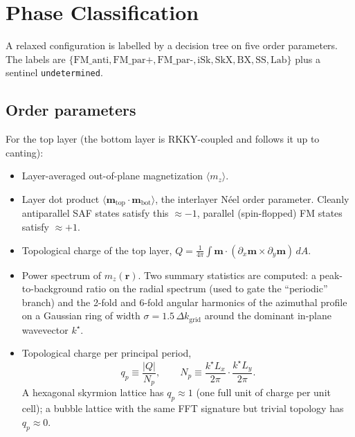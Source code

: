 \documentclass[11pt,a4paper]{article}
\newcommand{\mb}[1]{\mathbf{#1}}
\begin{document}
\section{Phase Classification}

A relaxed configuration is labelled by a decision tree on
five order parameters. The labels are
$\{\text{FM\_anti}, \text{FM\_par+}, \text{FM\_par-},
\text{iSk}, \text{SkX}, \text{BX}, \text{SS},
\text{Lab}\}$ plus a sentinel \texttt{undetermined}.

\subsection{Order parameters}

For the top layer (the bottom layer is RKKY-coupled and
follows it up to canting):
%
\begin{itemize}[nosep]
\item Layer-averaged out-of-plane magnetization
    $\langle m_z \rangle$.
\item Layer dot product
    $\langle \mb{m}_{\text{top}} \cdot
    \mb{m}_{\text{bot}} \rangle$, the interlayer
    Néel order parameter. Cleanly antiparallel SAF
    states satisfy this $\approx -1$, parallel
    (spin-flopped) FM states satisfy $\approx +1$.
\item Topological charge of the top layer,
    $Q = \frac{1}{4\pi} \int \mb{m} \cdot
    (\partial_x \mb{m} \times \partial_y \mb{m}) \, dA$.
\item Power spectrum of $m_z(\mb{r})$. Two summary
    statistics are computed: a peak-to-background ratio
    on the radial spectrum (used to gate the
    ``periodic'' branch) and the
    2-fold and 6-fold angular harmonics of the azimuthal
    profile on a Gaussian ring of width
    $\sigma = 1.5\, \Delta k_{\text{grid}}$ around the
    dominant in-plane wavevector $k^\star$.
\item Topological charge per principal period,
    \begin{equation}\label{eq:q_per_period}
    q_p \equiv \frac{|Q|}{N_p},
    \qquad
    N_p \equiv
    \frac{k^\star L_x}{2\pi} \cdot
    \frac{k^\star L_y}{2\pi}.
    \end{equation}
    A hexagonal skyrmion lattice has $q_p \approx 1$
    (one full unit of charge per unit cell); a bubble
    lattice with the same FFT signature but trivial
    topology has $q_p \approx 0$.
\end{itemize}
\end{document}
